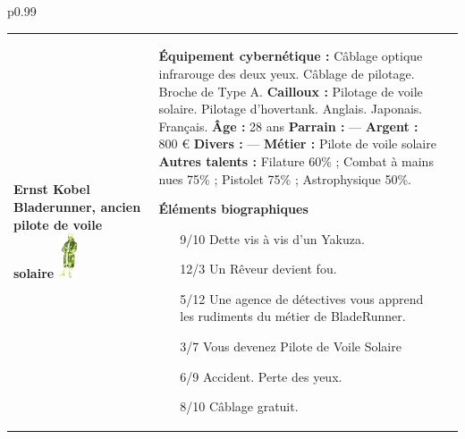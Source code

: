 \documentclass[11pt,twoside,a4paper]{article}
\begin{document}
\begin{longtable}[ht]{ p{} }
		\hline 
	\endfirsthead
		\hline
	\endhead
		\hline
	\endfoot
		\hline
	\endlastfoot
	\begin{tabular}[h]{ p{} p{} p{} }
		\textbf{Ernst Kobel}										\newline
		\textbf{\small Bladerunner, ancien pilote de voile solaire}	\newline
			\newline
		\includegraphics[width=0.15\textwidth]{img/personnageErnstKobel.jpg}
			\newline
		
		& %
			
		\textbf{{\'E}quipement cybern{\'e}tique : }C{\^a}blage optique infrarouge des deux yeux. C{\^a}blage de pilotage. Broche de Type A. \newline
		\textbf{Cailloux : }Pilotage de voile solaire. Pilotage d'hovertank. Anglais. Japonais. Fran\c{c}ais. \newline
		\textbf{{\^A}ge : } 28 ans 											\newline
		\textbf{Parrain : } --- 											\newline
		\textbf{Argent : } 800 \euro 										\newline
		\textbf{Divers : } ---												\newline
		\textbf{M{\'e}tier : } Pilote de voile solaire						\newline
		\textbf{Autres talents : } Filature 60\% ; Combat {\`a} mains nues 75\% ; Pistolet 75\% ; Astrophysique 50\%. \newline
		
		\textbf{{\'E}l{\'e}ments biographiques}
		\begin{itemize}
			\item[9/10] Dette vis {\`a} vis d'un Yakuza. 
			\item[12/3] Un R{\^e}veur devient fou. 
			\item[5/12] Une agence de d{\'e}tectives vous apprend les rudiments du m{\'e}tier de BladeRunner. 
			\item[3/7] Vous devenez Pilote de Voile Solaire
			\item[6/9] Accident. Perte des yeux. 
			\item[8/10] C{\^a}blage gratuit. 
		\end{itemize}
		

\end{tabular}
\end{longtable}
\end{document}
